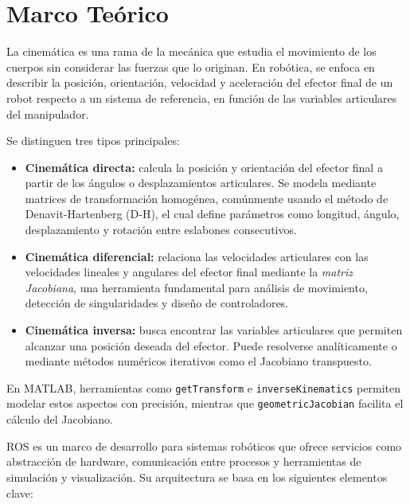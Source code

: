 \chapter{Marco Teórico} 
\label{chap:marco_teorico}

La cinemática es una rama de la mecánica que estudia el movimiento de los cuerpos sin considerar las fuerzas que lo originan. En robótica, se enfoca en describir la posición, orientación, velocidad y aceleración del efector final de un robot respecto a un sistema de referencia, en función de las variables articulares del manipulador.

Se distinguen tres tipos principales:

\begin{itemize}
	\item \textbf{Cinemática directa:} calcula la posición y orientación del efector final a partir de los ángulos o desplazamientos articulares. Se modela mediante matrices de transformación homogénea, comúnmente usando el método de Denavit-Hartenberg (D-H), el cual define parámetros como longitud, ángulo, desplazamiento y rotación entre eslabones consecutivos.
	
	\item \textbf{Cinemática diferencial:} relaciona las velocidades articulares con las velocidades lineales y angulares del efector final mediante la \textit{matriz Jacobiana}, una herramienta fundamental para análisis de movimiento, detección de singularidades y diseño de controladores.
	
	\item \textbf{Cinemática inversa:} busca encontrar las variables articulares que permiten alcanzar una posición deseada del efector. Puede resolverse analíticamente o mediante métodos numéricos iterativos como el Jacobiano transpuesto.
\end{itemize}

En MATLAB, herramientas como \texttt{getTransform} e \texttt{inverseKinematics} permiten modelar estos aspectos con precisión, mientras que \texttt{geometricJacobian} facilita el cálculo del Jacobiano.


ROS es un marco de desarrollo para sistemas robóticos que ofrece servicios como abstracción de hardware, comunicación entre procesos y herramientas de simulación y visualización. Su arquitectura se basa en los siguientes elementos clave:

